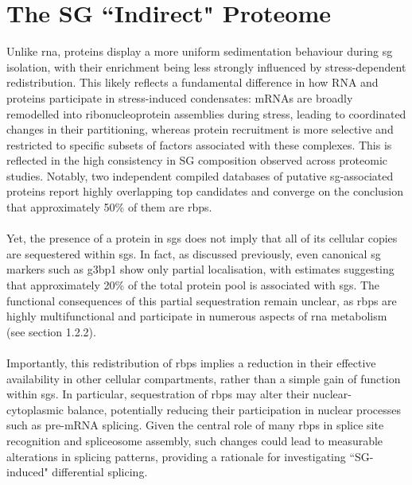 \chapter{The SG ``Indirect" Proteome}
\label{chap:ChapterII}

Unlike \gls{rna}, proteins display a more uniform sedimentation behaviour during \gls{sg} isolation, with their enrichment being less strongly influenced by stress-dependent redistribution. This likely reflects a fundamental difference in how RNA and proteins participate in stress-induced condensates: mRNAs are broadly remodelled into ribonucleoprotein assemblies during stress, leading to coordinated changes in their partitioning, whereas protein recruitment is more selective and restricted to specific subsets of factors associated with these complexes\cite{glauninger_transcriptome-wide_2025}. This is reflected in the high consistency in SG composition observed across proteomic studies\cite{nunes_msgp_2019, millar_new_2023}. Notably, two independent compiled databases of putative \gls{sg}-associated proteins report highly overlapping top candidates and converge on the conclusion that approximately 50\% of them are \glspl{rbp}\cite{nunes_msgp_2019, millar_new_2023}.
\\
\\
Yet, the presence of a protein in \gls{sg}s does not imply that all of its cellular copies are sequestered within \glspl{sg}. In fact, as discussed previously, even canonical \gls{sg} markers such as \gls{g3bp1} show only partial localisation, with estimates suggesting that approximately 20\% of the total protein pool is associated with \glspl{sg}\cite{somasekharan_g3bp1-linked_2020}. The functional consequences of this partial sequestration remain unclear, as \glspl{rbp} are highly multifunctional and participate in numerous aspects of \gls{rna} metabolism (see section 1.2.2).
\\
\\
Importantly, this redistribution of \glspl{rbp} implies a reduction in their effective availability in other cellular compartments, rather than a simple gain of function within \glspl{sg}. In particular, sequestration of \glspl{rbp} may alter their nuclear-cytoplasmic balance, potentially reducing their participation in nuclear processes such as pre-mRNA splicing. Given the central role of many \glspl{rbp} in splice site recognition and spliceosome assembly, such changes could lead to measurable alterations in splicing patterns, providing a rationale for investigating ``SG-induced" differential splicing.

